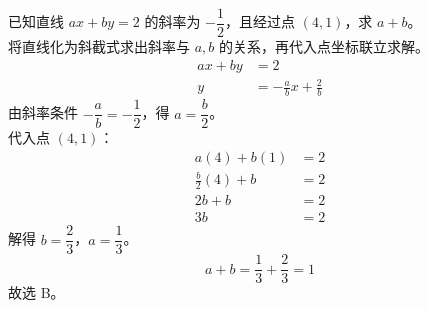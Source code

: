 \documentclass[12pt,a4paper]{exam-zh}
\begin{document}
\begin{solution}
    已知直线 $ax+by=2$ 的斜率为 $-\dfrac{1}{2}$，且经过点 $(4,1)$，求 $a+b$。 \\
    将直线化为斜截式求出斜率与 $a,b$ 的关系，再代入点坐标联立求解。
    \begin{align*}
        ax+by &= 2 \\
        y &= -\frac{a}{b}x+\frac{2}{b}
    \end{align*}
    由斜率条件 $-\dfrac{a}{b}=-\dfrac{1}{2}$，得 $a=\dfrac{b}{2}$。 \\
    代入点 $(4,1)$：
    \begin{align*}
        a(4)+b(1) &= 2 \\
        \frac{b}{2}(4)+b &= 2 \\
        2b+b &= 2 \\
        3b &= 2
    \end{align*}
    解得 $b=\dfrac{2}{3}$，$a=\dfrac{1}{3}$。
    \[
        a+b = \frac{1}{3}+\frac{2}{3} = 1
    \]
    故选 B。
\end{solution}



\end{document}
